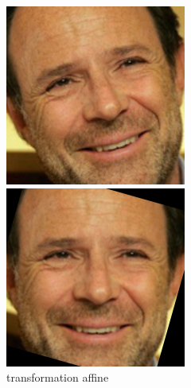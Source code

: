 \documentclass[12pt,french]{report}
\begin{document}
\begin{figure}[H]
	\begin{minipage}[b]{.47\linewidth}
		\begin{center}%
			\includegraphics{image_rapport/img2.png}
		\end{center}%
	\end{minipage}
	\hfill
	\begin{minipage}[b]{.47\linewidth}
		\begin{center}%
			\includegraphics{image_rapport/img2b.png}
		\end{center}%
	\end{minipage}
	\caption{transformation affine}\label{"prj"}%
\end{figure}




\end{document}
